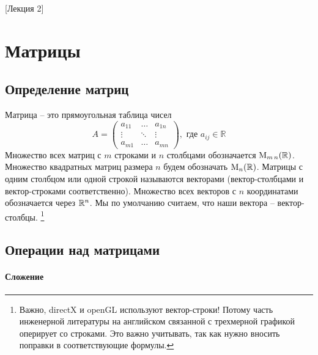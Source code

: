 [Лекция 2]

\newpage

\section{Матрицы}

\subsection{Определение матриц}

Матрица -- это прямоугольная таблица чисел
\[
A=
\begin{pmatrix}
a_{11}&\ldots& a_{1n}\\
\vdots&\ddots&\vdots\\
a_{m1}& \ldots &a_{mn}
\end{pmatrix},\text{ где } a_{ij}\in \mathbb R
\]
Множество всех матриц с $m$ строками и $n$ столбцами обозначается $\operatorname{M}_{m\,n}(\mathbb R)$.
Множество квадратных матриц размера $n$ будем обозначать $\operatorname{M}_{n}(\mathbb R)$.
Матрицы с одним столбцом или одной строкой называются векторами (вектор-столбцами и вектор-строками соответственно).
Множество всех векторов с $n$ координатами обозначается через $\mathbb R^{n}$.
Мы по умолчанию считаем, что наши вектора -- вектор-столбцы.%
\footnote{Важно, directX и openGL используют вектор-строки!
Потому часть инженерной литературы на английском связанной с трехмерной графикой оперирует со строками.
Это важно учитывать, так как нужно вносить поправки в соответствующие формулы.}

\subsection{Операции над матрицами}

\paragraph{Сложение}

